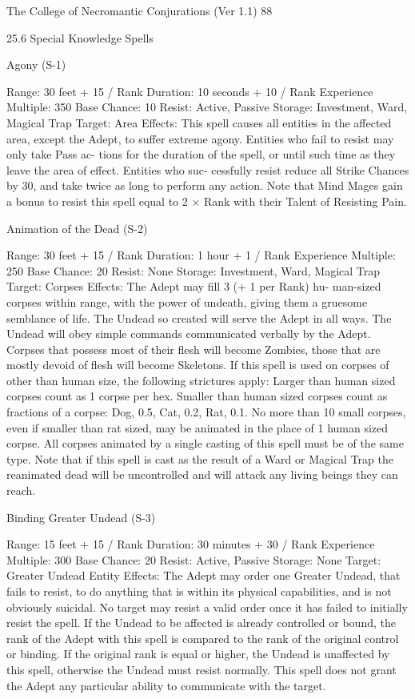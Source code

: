 \begin{Chapter}{The College of Necromantic Conjurations (Ver 1.1)}
88 

25.6 Special Knowledge Spells 

Agony (S-1) 

Range: 30 feet + 15 / Rank 
Duration: 10 seconds + 10 / Rank 
Experience Multiple: 350 
Base Chance: 10%
Resist: Active, Passive 
Storage: Investment, Ward, Magical Trap 
Target: Area 
Effects: This spell causes all entities in the affected 
area,  except  the  Adept,  to  suffer  extreme  agony. 
Entities  who  fail  to  resist  may  only  take  Pass  ac-
tions for the duration of the spell, or until such time 
as  they  leave  the  area  of  effect.  Entities  who  suc-
cessfully  resist  reduce  all  Strike  Chances  by  30, 
and take twice as long to perform any action. Note 
that  Mind  Mages  gain  a  bonus  to  resist  this  spell 
equal  to  2  ×  Rank  with  their  Talent  of  Resisting 
Pain. 

Animation of the Dead (S-2) 

Range: 30 feet + 15 / Rank 
Duration: 1 hour + 1 / Rank 
Experience Multiple: 250 
Base Chance: 20%
Resist: None 
Storage: Investment, Ward, Magical Trap 
Target: Corpses 
Effects:  The  Adept  may  fill  3  (+  1  per  Rank)  hu-
man-sized corpses within range, with the power of 
undeath,  giving  them  a  gruesome  semblance  of 
life. The Undead so created will serve the Adept in 
all ways. The Undead will obey simple commands 
communicated verbally by the Adept. Corpses that 
possess  most  of  their  flesh  will  become  Zombies, 
those  that  are  mostly  devoid  of  flesh  will  become 
Skeletons.  If  this  spell  is  used  on  corpses  of  other 
than  human  size,  the  following  strictures  apply: 
Larger than human sized corpses count as 1 corpse 
per hex. Smaller than human sized corpses count as 
fractions  of  a  corpse:  Dog,  0.5,  Cat,  0.2,  Rat,  0.1. 
No  more  than  10  small  corpses,  even  if  smaller 
than  rat  sized,  may  be  animated  in  the  place  of  1 
human  sized  corpse.  All  corpses  animated  by  a 
single  casting  of  this  spell  must  be  of  the  same 
type. Note that if this spell is cast as the result of a 
Ward or Magical Trap the reanimated dead will be 
uncontrolled and will attack any living beings they 
can reach. 

Binding Greater Undead (S-3) 

Range: 15 feet + 15 / Rank 
Duration: 30 minutes + 30 / Rank 
Experience Multiple: 300 
Base Chance: 20%
Resist: Active, Passive 
Storage: None 
Target: Greater Undead Entity 
Effects: The Adept may order one Greater Undead, 
that fails to resist, to do anything that is within its 
physical capabilities, and is not obviously suicidal. 
No target may resist a valid order once it has failed 
to  initially  resist  the  spell.  If  the  Undead  to  be 
affected is already controlled or bound, the rank of 
the Adept with this spell is compared to the rank of 
the original control or binding. If the original rank 
is equal or higher, the Undead is unaffected by this 
spell,  otherwise  the  Undead  must  resist  normally. 
This  spell  does  not  grant  the  Adept  any  particular 
ability to communicate with the target. 


\end{Chapter}
